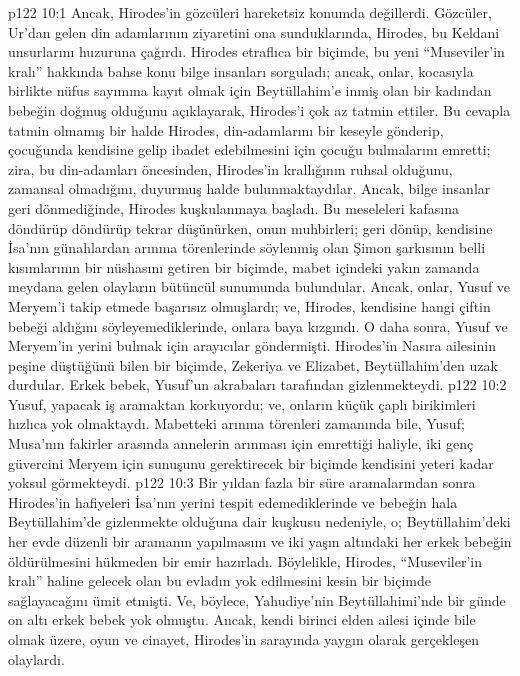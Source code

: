 \vs p122 10:1 Ancak, Hirodes’in gözcüleri hareketsiz konumda değillerdi. Gözcüler, Ur’dan gelen din adamlarının ziyaretini ona sunduklarında, Hirodes, bu Keldani unsurlarını huzuruna çağırdı. Hirodes etraflıca bir biçimde, bu yeni “Museviler’in kralı” hakkında bahse konu bilge insanları sorguladı; ancak, onlar, kocasıyla birlikte nüfus sayımına kayıt olmak için Beytüllahim’e inmiş olan bir kadından bebeğin doğmuş olduğunu açıklayarak, Hirodes’i çok az tatmin ettiler. Bu cevapla tatmin olmamış bir halde Hirodes, din\hyp{}adamlarını bir keseyle gönderip, çocuğunda kendisine gelip ibadet edebilmesini için çocuğu bulmalarını emretti; zira, bu din\hyp{}adamları öncesinden, Hirodes’in krallığının ruhsal olduğunu, zamansal olmadığını, duyurmuş halde bulunmaktaydılar. Ancak, bilge insanlar geri dönmediğinde, Hirodes kuşkulanmaya başladı. Bu meseleleri kafasına döndürüp döndürüp tekrar düşünürken, onun muhbirleri; geri dönüp, kendisine İsa’nın günahlardan arınma törenlerinde söylenmiş olan Şimon şarkısının belli kısımlarının bir nüshasını getiren bir biçimde, mabet içindeki yakın zamanda meydana gelen olayların bütüncül sunumunda bulundular. Ancak, onlar, Yusuf ve Meryem’i takip etmede başarısız olmuşlardı; ve, Hirodes, kendisine hangi çiftin bebeği aldığını söyleyemediklerinde, onlara baya kızgındı. O daha sonra, Yusuf ve Meryem’in yerini bulmak için arayıcılar göndermişti. Hirodes’in Nasıra ailesinin peşine düştüğünü bilen bir biçimde, Zekeriya ve Elizabet, Beytüllahim’den uzak durdular. Erkek bebek, Yusuf’un akrabaları tarafından gizlenmekteydi.
\vs p122 10:2 Yusuf, yapacak iş aramaktan korkuyordu; ve, onların küçük çaplı birikimleri hızlıca yok olmaktaydı. Mabetteki arınma törenleri zamanında bile, Yusuf; Musa’nın fakirler arasında annelerin arınması için emrettiği haliyle, iki genç güvercini Meryem için sunuşunu gerektirecek bir biçimde kendisini yeteri kadar yoksul görmekteydi.
\vs p122 10:3 Bir yıldan fazla bir süre aramalarından sonra Hirodes’in hafiyeleri İsa’nın yerini tespit edemediklerinde ve bebeğin hala Beytüllahim’de gizlenmekte olduğuna dair kuşkusu nedeniyle, o; Beytüllahim’deki her evde düzenli bir aramanın yapılmasını ve iki yaşın altındaki her erkek bebeğin öldürülmesini hükmeden bir emir hazırladı. Böylelikle, Hirodes, “Museviler’in kralı” haline gelecek olan bu evladın yok edilmesini kesin bir biçimde sağlayacağını ümit etmişti. Ve, böylece, Yahudiye’nin Beytüllahimi’nde bir günde on altı erkek bebek yok olmuştu. Ancak, kendi birinci elden ailesi içinde bile olmak üzere, oyun ve cinayet, Hirodes’in sarayında yaygın olarak gerçekleşen olaylardı.
